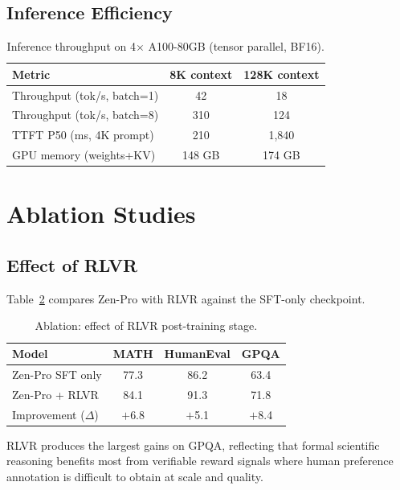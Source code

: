 \documentclass[11pt,a4paper]{article}
\begin{document}
\subsection{Inference Efficiency}

\begin{table}[H]
\centering
\caption{Inference throughput on 4$\times$ A100-80GB (tensor parallel, BF16).}
\label{tab:inference}
\begin{tabular}{lcc}
\toprule
\textbf{Metric} & \textbf{8K context} & \textbf{128K context} \\
\midrule
Throughput (tok/s, batch=1)  & 42  & 18 \\
Throughput (tok/s, batch=8)  & 310 & 124 \\
TTFT P50 (ms, 4K prompt)     & 210 & 1{,}840 \\
GPU memory (weights+KV)      & 148 GB & 174 GB \\
\bottomrule
\end{tabular}
\end{table}

\section{Ablation Studies}

\subsection{Effect of RLVR}

Table~\ref{tab:ablation} compares Zen-Pro with RLVR against the SFT-only checkpoint.

\begin{table}[H]
\centering
\caption{Ablation: effect of RLVR post-training stage.}
\label{tab:ablation}
\begin{tabular}{lccc}
\toprule
\textbf{Model} & \textbf{MATH} & \textbf{HumanEval} & \textbf{GPQA} \\
\midrule
Zen-Pro SFT only   & 77.3 & 86.2 & 63.4 \\
Zen-Pro + RLVR     & 84.1 & 91.3 & 71.8 \\
\midrule
Improvement ($\Delta$) & $+$6.8 & $+$5.1 & $+$8.4 \\
\bottomrule
\end{tabular}
\end{table}

RLVR produces the largest gains on GPQA, reflecting that formal scientific reasoning benefits
most from verifiable reward signals where human preference annotation is difficult to obtain at
scale and quality.
\end{document}
